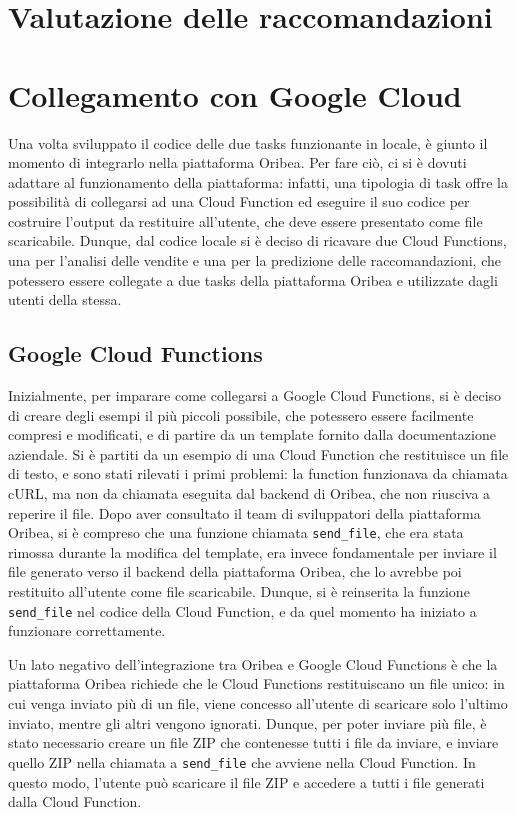 \section{Valutazione delle raccomandazioni}

\section{Collegamento con Google Cloud}

Una volta sviluppato il codice delle due tasks funzionante in locale, è giunto il momento di integrarlo nella piattaforma Oribea.
Per fare ciò, ci si è dovuti adattare al funzionamento della piattaforma: infatti, una tipologia di task offre la possibilità di collegarsi ad una Cloud Function ed eseguire il suo codice per costruire l'output da restituire all'utente, che deve essere presentato come file scaricabile. Dunque, dal codice locale si è deciso di ricavare due Cloud Functions, una per l'analisi delle vendite e una per la predizione delle raccomandazioni, che potessero essere collegate a due tasks della piattaforma Oribea e utilizzate dagli utenti della stessa.

\subsection{Google Cloud Functions}

Inizialmente, per imparare come collegarsi a Google Cloud Functions, si è deciso di creare degli esempi il più piccoli possibile, che potessero essere facilmente compresi e modificati, e di partire da un template fornito dalla documentazione aziendale. Si è partiti da un esempio di una Cloud Function che restituisce un file di testo, e sono stati rilevati i primi problemi: la function funzionava da chiamata cURL, ma non da chiamata eseguita dal backend di Oribea, che non riusciva a reperire il file. Dopo aver consultato il team di sviluppatori della piattaforma Oribea, si è compreso che una funzione chiamata \texttt{send\_file}, che era stata rimossa durante la modifica del template, era invece fondamentale per inviare il file generato verso il backend della piattaforma Oribea, che lo avrebbe poi restituito all'utente come file scaricabile. Dunque, si è reinserita la funzione \texttt{send\_file} nel codice della Cloud Function, e da quel momento ha iniziato a funzionare correttamente.

Un lato negativo dell'integrazione tra Oribea e Google Cloud Functions è che la piattaforma Oribea richiede che le Cloud Functions restituiscano un file unico: in cui venga inviato più di un file, viene concesso all'utente di scaricare solo l'ultimo inviato, mentre gli altri vengono ignorati. Dunque, per poter inviare più file, è stato necessario creare un file ZIP che contenesse tutti i file da inviare, e inviare quello ZIP nella chiamata a \texttt{send\_file} che avviene nella Cloud Function. In questo modo, l'utente può scaricare il file ZIP e accedere a tutti i file generati dalla Cloud Function.

